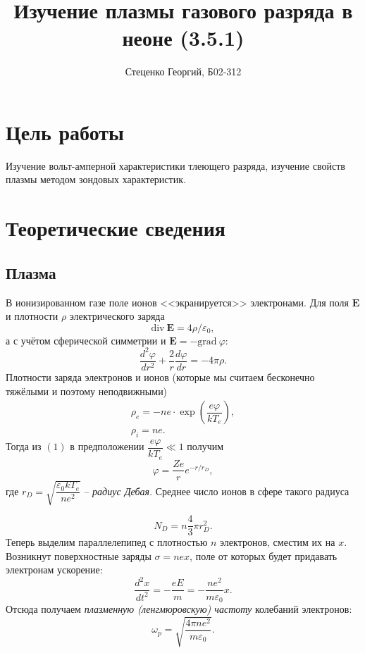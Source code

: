\documentclass[12pt, a4paper]{article}
\title{Изучение плазмы газового разряда в неоне (3.5.1)}
\author{Стеценко Георгий, Б02-312}
\date{}
\begin{document}
	\maketitle
	
	\section{Цель работы} 
Изучение вольт-амперной характеристики тлеющего разряда, изучение свойств плазмы методом зондовых характеристик.



\section{Теоретические сведения}
\subsection{Плазма}
В ионизированном газе поле ионов <<экранируется>> электронами. Для поля $\mathbf{E}$ и плотности $\rho$ электрического заряда
$$
\text{div}~\mathbf{E} = 4 \rho / \varepsilon_0,
$$
а с учётом сферической симметрии и $\mathbf{E} = -\text{grad}~\varphi$:
\begin{equation}
\dfrac{d^2 \varphi}{dr^2}+\dfrac{2}{r}\dfrac{d\varphi}{dr}=-4\pi \rho.
\end{equation}
Плотности заряда электронов и ионов (которые мы считаем бесконечно тяжёлыми и поэтому неподвижными)
\begin{equation}
\begin{array}{c}
\rho_e = -ne \cdot \exp\left(\dfrac{e\varphi}{kT_e}\right),\\
\rho_i = ne.
\end{array}
\end{equation}
Тогда из $(1)$ в предположении $\dfrac{e\varphi}{kT_e} \ll 1$ получим
\begin{equation}
\varphi = \dfrac{Ze}{r}e^{-r/r_D},
\end{equation}
где $r_D = \sqrt{\dfrac{\varepsilon_0 kT_e}{n e^2}}$ -- \textit{радиус Дебая}. Среднее число ионов в сфере такого радиуса  

\begin{equation}
N_D = n\dfrac{4}{3}\pi r_D^2.
\end{equation}
Теперь выделим параллелепипед с плотностью $n$ электронов, сместим их на $x$. Возникнут поверхностные заряды $\sigma = nex$, поле от которых будет придавать электронам ускорение:
$$
\dfrac{d^2x}{dt^2}=-\dfrac{eE}{m}=-\dfrac{n e^2}{m \varepsilon_0}x.
$$ 
Отсюда получаем \textit{плазменную (ленгмюровскую) частоту} колебаний электронов:
\begin{equation}
\omega_p = \sqrt{\dfrac{4\pi ne^2}{m \varepsilon_0}}.
\end{equation}
\end{document}
